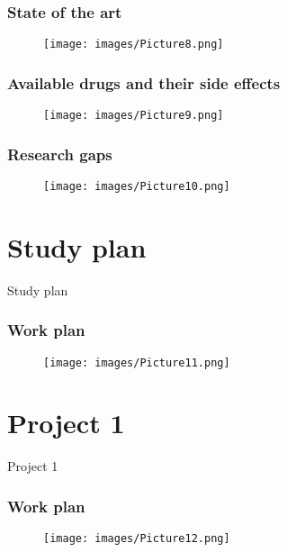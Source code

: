\documentclass{beamer}
\begin{document}
\begin{frame}
\frametitle{\textbf{State of the art}}
\begin{figure}
\texttt{[image: images/Picture8.png]}
\end{figure}
\end{frame}

\begin{frame}
\frametitle{\textbf{Available drugs and their side effects}}
\begin{figure}
\texttt{[image: images/Picture9.png]}
\end{figure}
\end{frame}

\begin{frame}
\frametitle{\textbf{Research gaps}}
\begin{figure}
\texttt{[image: images/Picture10.png]}
\end{figure}
\end{frame}

\section{Study plan}

\begin{frame}
\begin{block}
\Huge{\centerline{Study plan}}
\end{block}
\end{frame}

\begin{frame}
\frametitle{\textbf{Work plan}}
\begin{figure}
\texttt{[image: images/Picture11.png]}
\end{figure}
\end{frame}


\section{Project 1}

\begin{frame}
\begin{block}
\Huge{\centerline{Project 1}}
\end{block}
\end{frame}

\begin{frame}
\frametitle{\textbf{Work plan}}
\begin{figure}
\texttt{[image: images/Picture12.png]}
\end{figure}
\end{frame}
\end{document}
